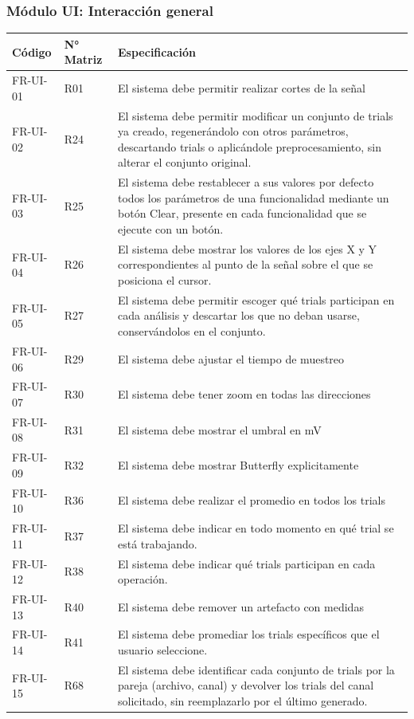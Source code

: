 \documentclass[12pt, letterpaper]{article}
\begin{document}
\subsubsection{Módulo UI: Interacción general}

\begin{longtable}{|p{2.5cm}|p{2.5cm}|p{10.1cm}|}
\hline
\rowcolor{gray!25}
\textbf{Código} & \textbf{N° Matriz} & \textbf{Especificación} \\
\hline
\endhead

\hline
\endlastfoot

FR-UI-01 & R01 & El sistema debe permitir realizar cortes de la señal \\
\hline
FR-UI-02 & R24 & El sistema debe permitir modificar un conjunto de trials ya creado, regenerándolo con otros parámetros, descartando trials o aplicándole preprocesamiento, sin alterar el conjunto original. \\
\hline
FR-UI-03 & R25 & El sistema debe restablecer a sus valores por defecto todos los parámetros de una funcionalidad mediante un botón Clear, presente en cada funcionalidad que se ejecute con un botón. \\
\hline
FR-UI-04 & R26 & El sistema debe mostrar los valores de los ejes X y Y correspondientes al punto de la señal sobre el que se posiciona el cursor. \\
\hline
FR-UI-05 & R27 & El sistema debe permitir escoger qué trials participan en cada análisis y descartar los que no deban usarse, conservándolos en el conjunto. \\
\hline
FR-UI-06 & R29 & El sistema debe ajustar el tiempo de muestreo \\
\hline
FR-UI-07 & R30 & El sistema debe tener zoom en todas las direcciones \\
\hline
FR-UI-08 & R31 & El sistema debe mostrar el umbral en mV \\
\hline
FR-UI-09 & R32 & El sistema debe mostrar Butterfly explicitamente \\
\hline
FR-UI-10 & R36 & El sistema debe realizar el promedio en todos los trials \\
\hline
FR-UI-11 & R37 & El sistema debe indicar en todo momento en qué trial se está trabajando. \\
\hline
FR-UI-12 & R38 & El sistema debe indicar qué trials participan en cada operación. \\
\hline
FR-UI-13 & R40 & El sistema debe remover un artefacto con medidas \\
\hline
FR-UI-14 & R41 & El sistema debe promediar los trials específicos que el usuario seleccione. \\
\hline
FR-UI-15 & R68 & El sistema debe identificar cada conjunto de trials por la pareja (archivo, canal) y devolver los trials del canal solicitado, sin reemplazarlo por el último generado. \\

\end{longtable}
\vspace{-0.5em}
\label{tab:fr-ui}
\end{document}
